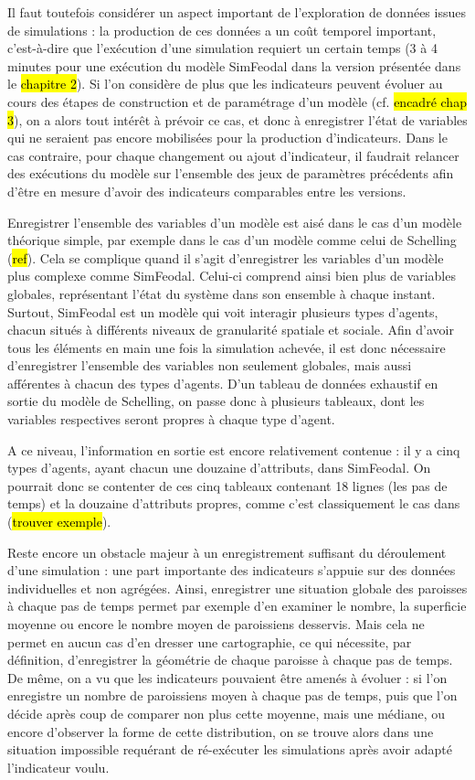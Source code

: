 	Il faut toutefois considérer un aspect important de l'exploration de données issues de simulations : la production de ces données a un coût temporel important, c'est-à-dire que l’exécution d'une simulation requiert un certain temps (3 à 4 minutes pour une exécution du modèle SimFeodal dans la version présentée dans le \hl{chapitre 2}).
	Si l'on considère de plus que les indicateurs peuvent évoluer au cours des étapes de construction et de paramétrage d'un modèle (cf. \hl{encadré chap 3}), on a alors tout intérêt à prévoir ce cas, et donc à enregistrer l'état de variables qui ne seraient pas encore mobilisées pour la production d'indicateurs.
	Dans le cas contraire, pour chaque changement ou ajout d'indicateur, il faudrait relancer des exécutions du modèle sur l'ensemble des jeux de paramètres précédents afin d'être en mesure d'avoir des indicateurs comparables entre les versions.

	Enregistrer l'ensemble des variables d'un modèle est aisé dans le cas d'un modèle théorique simple, par exemple dans le cas d'un modèle comme celui de Schelling (\hl{ref}). Cela se complique quand il s'agit d'enregistrer les variables d'un modèle plus complexe comme SimFeodal.
	Celui-ci comprend ainsi bien plus de variables globales, représentant l'état du système dans son ensemble à chaque instant.
	Surtout, SimFeodal est un modèle qui voit interagir plusieurs types d'agents, chacun situés à différents niveaux de granularité spatiale et sociale.
	Afin d'avoir tous les éléments en main une fois la simulation achevée, il est donc nécessaire d'enregistrer l'ensemble des variables non seulement globales, mais aussi afférentes à chacun des types d'agents.
	D'un tableau de données exhaustif en sortie du modèle de Schelling, on passe donc à plusieurs tableaux, dont les variables respectives seront propres à chaque type d'agent.

	A ce niveau, l'information en sortie est encore relativement contenue : il y a cinq types d'agents, ayant chacun une douzaine d'attributs, dans SimFeodal. On pourrait donc se contenter de ces cinq tableaux contenant 18 lignes (les pas de temps) et la douzaine d'attributs propres, comme c'est classiquement le cas dans (\hl{trouver exemple}).

	Reste encore un obstacle majeur à un enregistrement suffisant du déroulement d'une simulation : une part importante des indicateurs s'appuie sur des données individuelles et non agrégées.
	Ainsi, enregistrer une situation globale des paroisses à chaque pas de temps permet par exemple d'en examiner le nombre, la superficie moyenne ou encore le nombre moyen de paroissiens desservis.
	Mais cela ne permet en aucun cas d'en dresser une cartographie, ce qui nécessite, par définition, d'enregistrer la géométrie de chaque paroisse à chaque pas de temps.
	De même, on a vu que les indicateurs pouvaient être amenés à évoluer : si l'on enregistre un nombre de paroissiens moyen à chaque pas de temps, puis que l'on décide après coup de comparer non plus cette moyenne, mais une médiane, ou encore d'observer la forme de cette distribution, on se trouve alors dans une situation impossible requérant de ré-exécuter les simulations après avoir adapté l'indicateur voulu.

